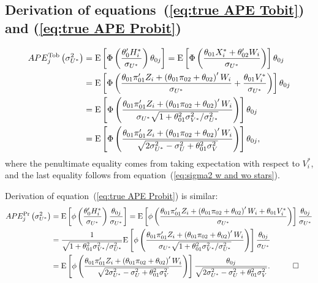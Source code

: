 \documentclass[12pt]{article}
\begin{document}
\begin{appendices}
\subsection{Derivation of equations~(\protect\ref{eq:true APE Tobit}) and (\protect\ref{eq:true APE Probit})}
\begin{align*}
APE_{j}^{\text{Tob}}\left( \sigma _{U^{\ast }}^{2}\right) & =\mathrm{E}\left[
\Phi \left( \frac{\theta _{0}^{\prime }H_{i}^{\ast }}{\sigma _{U^{\ast }}}%
\right) \theta _{0j}\right] =\mathrm{E}\left[ \Phi \left( \frac{\theta
_{01}X_{i}^{\ast }+\theta _{02}^{\prime }W_{i}}{\sigma _{U^{\ast }}}\right) %
\right] \theta _{0j}{} \\
& =\mathrm{E}\left[ \Phi \left( \frac{\theta _{01}\pi _{01}^{\prime
}Z_{i}+\left( \theta _{01}\pi _{02}+\theta _{02}\right) ^{\prime }W_{i}}{%
\sigma _{U^{\ast }}}+\frac{\theta _{01}V_{i}^{\ast }}{\sigma _{U^{\ast }}}%
\right) \right] \theta _{0j} \\
& =\mathrm{E}\left[ \Phi \left( \frac{\theta _{01}\pi _{01}^{\prime
}Z_{i}+\left( \theta _{01}\pi _{02}+\theta _{02}\right) ^{\prime }W_{i}}{%
\sigma _{U^{\ast }}\sqrt{1+\theta _{01}^{2}\sigma _{V^{\ast }}^{2}/\sigma
_{U^{\ast }}^{2}}}\right) \right] \theta _{0j} \\
& ={}\mathrm{E}\left[ \Phi \left( 
\frac{\theta _{01}\pi _{01}^{\prime }Z_{i}+\left( \theta _{01}\pi
_{02}+\theta _{02}\right) ^{\prime }W_{i}}{\sqrt{2\sigma _{U^{\ast
}}^{2}-\sigma _{U}^{2}+\theta _{01}^{2}\sigma _{V}^{2}}}\right) \right]
\theta _{0j},
\end{align*}%
where the penultimate equality comes from taking expectation with respect to 
$V_{i}^{\ast }$, and the last equality follows from equation~(\ref{eq:sigma2
w and wo stars}).

\bigskip

Derivation of equation~(\ref{eq:true APE Probit}) is similar:%
\begin{align*}
APE_{j}^{\text{Pr}}\left( \sigma _{U^{\ast }}^{2}\right) & =\mathrm{E}\left[
\phi \left( \frac{\theta _{0}^{\prime }H_{i}^{\ast }}{\sigma _{U^{\ast }}}%
\right) \frac{\theta _{0j}}{\sigma _{U^{\ast }}}\right] =\mathrm{E}\left[
\phi \left( \frac{\theta _{01}\pi _{01}^{\prime }Z_{i}+\left( \theta
_{01}\pi _{02}+\theta _{02}\right) ^{\prime }W_{i}+\theta _{01}V_{i}^{\ast }}{\sigma _{U^{\ast }}}%
\right) \right] \frac{%
\theta _{0j}}{\sigma _{U^{\ast }}} \\
& =\frac{1}{\sqrt{1+\theta _{01}^{2}\sigma _{V^{\ast }}^{2}/\sigma _{U^{\ast
}}^{2}}}\mathrm{E}\left[ \phi \left( \frac{\theta _{01}\pi _{01}^{\prime
}Z_{i}+\left( \theta _{01}\pi _{02}+\theta _{02}\right) ^{\prime }W_{i}}{%
\sigma _{U^{\ast }}\sqrt{1+\theta _{01}^{2}\sigma _{V^{\ast }}^{2}/\sigma
_{U^{\ast }}^{2}}}\right) \right] \frac{\theta _{0j}}{\sigma _{U^{\ast }}} \\
& ={}\mathrm{E}\left[ \phi
\left( \frac{\theta _{01}\pi _{01}^{\prime }Z_{i}+\left( \theta _{01}\pi
_{02}+\theta _{02}\right) ^{\prime }W_{i}}{\sqrt{2\sigma _{U^{\ast
}}^{2}-\sigma _{U}^{2}+\theta _{01}^{2}\sigma _{V}^{2}}}\right) \right] 
\frac{\theta _{0j}}{\sqrt{2\sigma _{U^{\ast }}^{2}-\sigma _{U}^{2}+\theta
_{01}^{2}\sigma _{V}^{2}}}.\qquad\quad \square
\end{align*}


\end{appendices}
\end{document}
